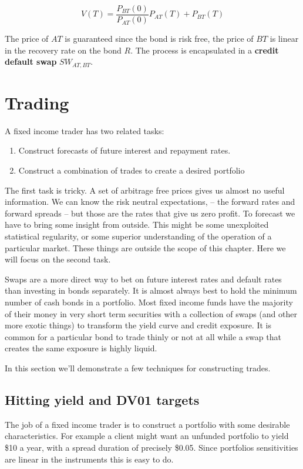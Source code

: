 \[ V(T) = \frac{P_{BT}(0)}{P_{AT}(0)}P_{AT}(T) + P_{BT}(T) \]

The price of $AT$ is guaranteed since the bond is risk free, the price of $BT$ is linear in the recovery rate on the bond $R$. The process is encapsulated in a \textbf{credit default swap} $SW_{AT,BT}$.


\section{Trading}

A fixed income trader has two related tasks: 

\begin{enumerate}
\item Construct forecasts of future interest and repayment rates.\\
\item Construct a combination of trades to create a desired portfolio
\end{enumerate}

The first task is tricky.  A set of arbitrage free prices gives us almost no useful information. We can know the risk neutral expectations, -- the forward rates and forward spreads -- but those are the rates that give us zero profit. To forecast we have to bring some insight from outside. This might be some unexploited statistical regularity, or some superior understanding of the operation of a particular market.  These things are outside the scope of this chapter. Here we will focus on the second task. 

Swaps are a more direct way to bet on future interest rates and default rates than investing in bonds separately. It is almost always best to hold the minimum number of cash bonds in a portfolio. Most fixed income funds have the majority of their money in very short term securities with a collection of swaps (and other more exotic things) to transform the yield curve and credit exposure. It is common for a particular bond to trade thinly or not at all while a swap that creates the same exposure is highly liquid. 

In this section we'll demonstrate a few techniques for constructing trades.

\subsection{Hitting yield and DV01 targets}

The job of a fixed income trader is to construct a portfolio with some desirable characteristics. For example a client might want an unfunded portfolio to yield \$10 a year, with a spread duration of precisely \$0.05. Since portfolios sensitivities are linear in the instruments this is easy to do. 

